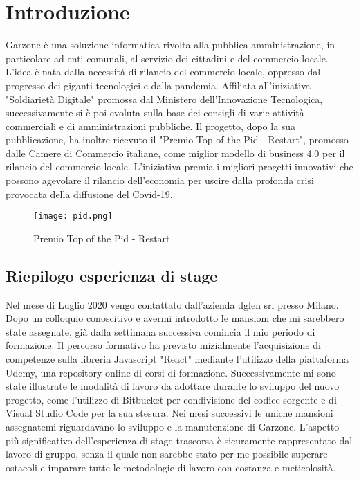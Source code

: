 \mainmatter
\chapter{Introduzione}
Garzone è una soluzione informatica rivolta alla pubblica amministrazione, in particolare ad enti comunali, al servizio dei cittadini e del commercio locale. L'idea è nata dalla necessità di rilancio del commercio locale, oppresso dal progresso dei giganti tecnologici e dalla pandemia. Affiliata all'iniziativa "Soldiarietà Digitale" promossa dal Ministero dell’Innovazione Tecnologica, successivamente si è poi evoluta sulla base dei consigli di varie attività commerciali e di amministrazioni pubbliche. Il progetto, dopo la sua pubblicazione, ha inoltre ricevuto il "Premio Top of the Pid - Restart", promosso dalle Camere di Commercio italiane, come miglior modello di business 4.0 per il rilancio del commercio locale. L’iniziativa premia i migliori progetti innovativi che possono agevolare il rilancio dell’economia per uscire dalla profonda crisi provocata della diffusione del Covid-19.
\begin{figure}[!htb]
    \centering
    \texttt{[image: pid.png]}
    \caption{Premio Top of the Pid - Restart}
\end{figure}
\section{Riepilogo esperienza di stage}
Nel mese di Luglio 2020 vengo contattato dall'azienda dglen srl presso Milano. Dopo un colloquio conoscitivo e avermi introdotto le mansioni che mi sarebbero state assegnate, già dalla settimana successiva comincia il mio periodo di formazione. Il percorso formativo ha previsto inizialmente l'acquisizione di competenze sulla libreria Javascript "React" mediante l'utilizzo della piattaforma Udemy, una repository online di corsi di formazione. Successivamente mi sono state illustrate le modalità di lavoro da adottare durante lo sviluppo del nuovo progetto, come l'utilizzo di Bitbucket per condivisione del codice sorgente e di Visual Studio Code per la sua stesura. Nei mesi successivi le uniche mansioni assegnatemi riguardavano lo sviluppo e la manutenzione di Garzone. L'aspetto più significativo dell'esperienza di stage trascorsa è sicuramente rappresentato dal lavoro di gruppo, senza il quale non sarebbe stato per me possibile superare ostacoli e imparare tutte le metodologie di lavoro con costanza e meticolosità.

